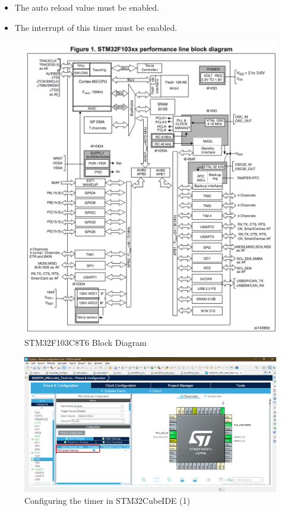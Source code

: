 \begin{itemize}
    \item The auto reload value must be enabled.
    \item The interrupt of this timer must be enabled.
\end{itemize}

\begin{figure}[h]
    \centering
    \includegraphics[scale=.22]{figuresEncoder/8.png}
    \caption{STM32F103C8T6 Block Diagram}
\end{figure}

\begin{figure}[h]
    \centering
    \includegraphics[scale=.34]{figuresEncoder/9.png}
    \caption{Configuring the timer in STM32CubeIDE (1)}
\end{figure}

